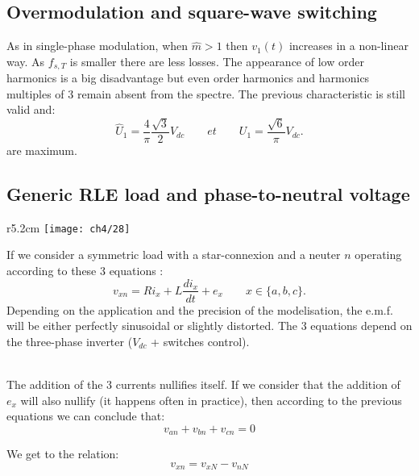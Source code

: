 	\subsection{Overmodulation and square-wave switching}
	    As in single-phase modulation, when $\hat{m}>1$ then $v_1(t)$ increases in a non-linear way. As $f_{s,T}$ is smaller there are less losses. The appearance of low order harmonics is a big disadvantage but even order harmonics and harmonics multiples of 3 remain absent from the spectre. The previous characteristic is still valid and:
		\begin{equation}
			\hat{U}_1 = \frac{4}{\pi}\frac{\sqrt{3}}{2}V_{dc}\qquad et \qquad U_1 = \frac{\sqrt{6}}{\pi}V_{dc}.
		\end{equation}
		are maximum.
		
	\subsection{Generic RLE load and phase-to-neutral voltage}
	\begin{wrapfigure}[12]{r}{5.2cm}
	\vspace{-5mm}
	\texttt{[image: ch4/28]}
	\label{fig:4.22}
	\end{wrapfigure}
	If we consider a symmetric load with a star-connexion and a neuter $n$ operating according to these 3 equations :
	\begin{equation}
		v_{xn} = Ri_x + L\frac{di_x}{dt} +e_x \qquad x\in \{ a, b, c \} .
	\end{equation}			
	Depending on the application and the precision of the modelisation, the e.m.f. will be either perfectly sinusoidal or slightly distorted.  The 3 equations depend on the three-phase inverter ($V_{dc}$ + switches control).
	
	 \ \\ The addition of the 3 currents nullifies itself. If we consider that the addition of $e_x$ will also nullify (it happens often in practice), then according to the previous equations we can conclude that:
	 \begin{equation}
	 	v_{an} +v_{bn}+v_{cn} = 0
	 	\label{eq:4.38}
	 \end{equation}
	 
	 We get to the relation: 
	 \begin{equation}
	 	v_{xn} = v_{xN} - v_{nN}
	 	\label{eq:4.39}
	 \end{equation}
	 
